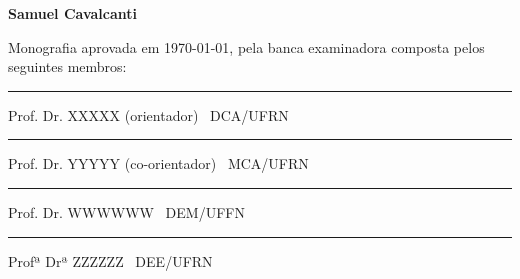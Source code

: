 %
%

\begin{titlepage}

\begin{center}

\LARGE

\textbf{\tccTitle}

\vfill

\Large

\textbf{Samuel Cavalcanti}

\end{center}

\vfill

\noindent
Monografia aprovada em \today, pela banca examinadora composta
pelos seguintes membros:


\begin{center}

\vspace{1.5cm}\rule{0.95\linewidth}{1pt}
\parbox{0.9\linewidth}{%
Prof. Dr. XXXXX (orientador) \dotfill\ DCA/UFRN}

\vspace{1.5cm}\rule{0.95\linewidth}{1pt}
\parbox{0.9\linewidth}{%
Prof. Dr. YYYYY (co-orientador) \dotfill\ MCA/UFRN}

\vspace{1.5cm}\rule{0.95\linewidth}{1pt}
\parbox{0.9\linewidth}{%
Prof. Dr. WWWWWW \dotfill\ DEM/UFFN}

\vspace{1.5cm}\rule{0.95\linewidth}{1pt}
\parbox{0.9\linewidth}{%
Profª Drª ZZZZZZ \dotfill\ DEE/UFRN}

\end{center}

\end{titlepage}

%
%


